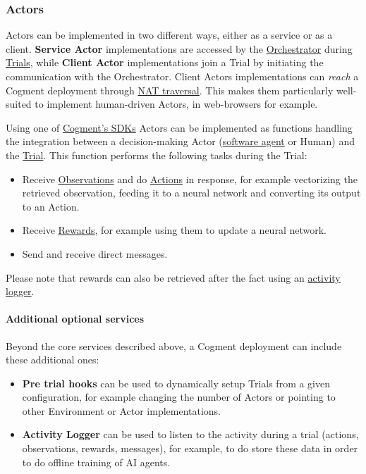 \hypertarget{actors-1}{%
\subsubsection{Actors}\label{actors-1}}

Actors can be implemented in two different ways, either as a service or
as a client. \textbf{Service Actor} implementations are accessed by the
\href{./glossary.md\#orchestrator}{Orchestrator} during
\href{./glossary.md\#trial}{Trials}, while \textbf{Client Actor}
implementations join a Trial by initiating the communication with the
Orchestrator. Client Actors implementations can \emph{reach} a Cogment
deployment through
\href{https://en.wikipedia.org/wiki/NAT_traversal}{NAT traversal}. This
makes them particularly well-suited to implement human-driven Actors, in
web-browsers for example.

Using one of \href{../cogment/cogment-api-guide.md}{Cogment's SDKs}
Actors can be implemented as functions handling the integration between
a decision-making Actor (\href{./glossary.md\#agent}{software agent} or
Human) and the \href{./glossary.md\#trial}{Trial}. This function
performs the following tasks during the Trial:

\begin{itemize}
\tightlist
\item
  Receive \href{./glossary.md\#observation}{Observations} and do
  \href{./glossary.md\#action}{Actions} in response, for example
  vectorizing the retrieved observation, feeding it to a neural network
  and converting its output to an Action.
\item
  Receive \href{./glossary.md\#reward}{Rewards}, for example using them
  to update a neural network.
\item
  Send and receive direct messages.
\end{itemize}

Please note that rewards can also be retrieved after the fact using an
\protect\hyperlink{additional-optional-services}{activity logger}.

\hypertarget{additional-optional-services}{%
\paragraph{Additional optional
services}\label{additional-optional-services}}

Beyond the core services described above, a Cogment deployment can
include these additional ones:

\begin{itemize}
\tightlist
\item
  \textbf{Pre trial hooks} can be used to dynamically setup Trials from
  a given configuration, for example changing the number of Actors or
  pointing to other Environment or Actor implementations.
\item
  \textbf{Activity Logger} can be used to listen to the activity during
  a trial (actions, observations, rewards, messages), for example, to do
  store these data in order to do offline training of AI agents.
\end{itemize}
